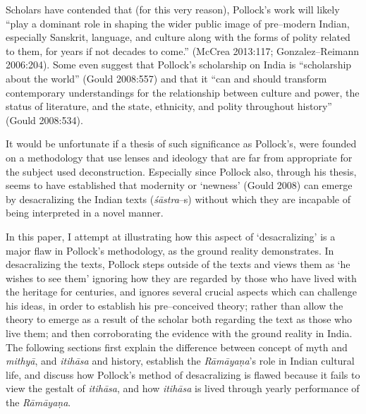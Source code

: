 Scholars have contended that (for this very reason), Pollock’s work will likely “play a dominant role in shaping the wider public image of pre–modern Indian, especially Sanskrit, language, and culture along with the forms of polity related to them, for years if not decades to come.” (McCrea 2013:117; Gonzalez–Reimann 2006:204). Some even suggest that Pollock’s scholarship on India is “scholarship about the world” (Gould 2008:557) and that it “can and should transform contemporary understandings for the relationship between culture and power, the status of literature, and the state, ethnicity, and polity throughout history” (Gould 2008:534).

It would be unfortunate if a thesis of such significance as Pollock’s, were founded on a methodology that use lenses and ideology that are far from appropriate for the subject used deconstruction. Especially since Pollock also, through his thesis, seems to have established that modernity or ‘newness’ (Gould 2008) can emerge by desacralizing the Indian texts (\textit{śāstra}–s) without which they are incapable of being interpreted in a novel manner.

In this paper, I attempt at illustrating how this aspect of ‘desacralizing’ is a major flaw in Pollock’s methodology, as the ground reality demonstrates. In desacralizing the texts, Pollock steps outside of the texts and views them as ‘he wishes to see them’ ignoring how they are regarded by those who have lived with the heritage for centuries, and ignores several crucial aspects which can challenge his ideas, in order to establish his pre–conceived theory; rather than allow the theory to emerge as a result of the scholar both regarding the text as those who live them; and then corroborating the evidence with the ground reality in India. The following sections first explain the difference between concept of myth and \textit{mithyā}, and \textit{itihāsa} and history, establish the \textit{Rāmāyaṇa}’s role in Indian cultural life, and discuss how Pollock’s method of desacralizing is flawed because it fails to view the gestalt of \textit{itihāsa}, and how \textit{itihāsa} is lived through yearly performance of the \textit{Rāmāyaṇa}.


